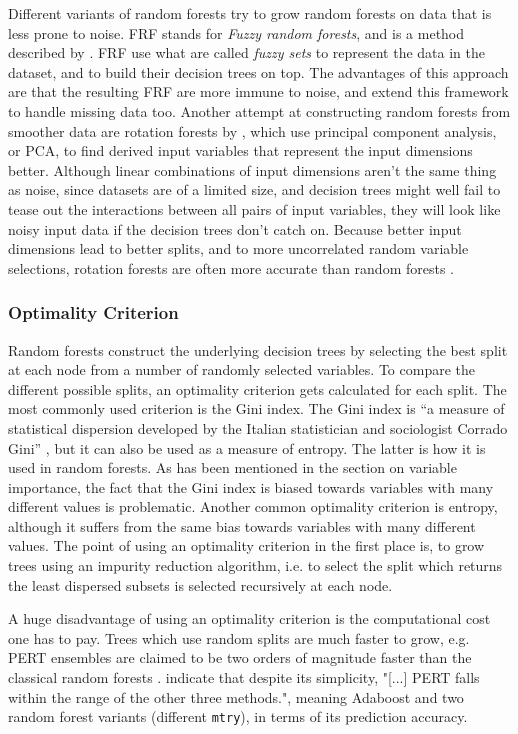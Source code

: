 \documentclass[a4paper,man,12pt,apacite,floatsintext,draftfirst]{apa6} %
\begin{document}
Different variants of random forests try to grow random forests on data
that is less prone to noise.
FRF stands for \emph{Fuzzy random forests}, and is a method described by
.
FRF use what are called \emph{fuzzy sets} to represent the data in the dataset,
and to build their decision trees on top.
The advantages of this approach are that the resulting FRF are more immune
to noise, and  extend this framework to
handle missing data too.
Another attempt at constructing random forests from smoother data are
rotation forests by \cite{rodriguez2006rotation}, which use
principal component analysis, or PCA, to find derived input variables that
represent the input dimensions better.
Although linear combinations of input dimensions aren't the same thing
as noise, since datasets are of a limited size, and decision trees
might well fail to tease out the interactions between all pairs of input
variables, they will look like noisy input data if the decision trees
don't catch on.
Because better input dimensions lead to better splits, and to more
uncorrelated random variable selections, rotation forests are often more
accurate than random forests \cite{rodriguez2006rotation}.

\subsubsection{Optimality Criterion}
Random forests construct the underlying decision trees by selecting the
best split at each node from a number of randomly selected variables.
To compare the different possible splits, an optimality criterion gets
calculated for each split.
The most commonly used criterion is the Gini index.
The Gini index is “a measure of statistical dispersion developed by the
Italian statistician and sociologist Corrado Gini” \cite{wpGINI},
but it can also be used as a measure of entropy.
The latter is how it is used in random forests.
As has been mentioned in the section on variable importance, the fact that
the Gini index is biased towards variables with many different values
is problematic.
Another common optimality criterion is entropy, although it suffers from
the same bias towards variables with many different values.
The point of using an optimality criterion in the first place is,
to grow trees using an impurity reduction algorithm, i.e. to select the split
which returns the least dispersed subsets is selected recursively at each node.

A huge disadvantage of using an optimality criterion is the computational cost
one has to pay.
Trees which use random splits are much faster to grow, e.g. PERT ensembles
are claimed to be two orders of magnitude faster than the classical
random forests \cite{cutler2001pert}.
 indicate that despite its simplicity,
"[...] PERT falls within the range of the other three methods.", meaning
Adaboost and two random forest variants (different \texttt{mtry}),
in terms of its prediction accuracy.
\end{document}
